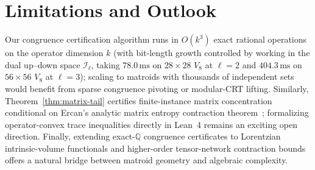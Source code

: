 \documentclass[11pt,a4paper]{article}
\theoremstyle{definition}
\theoremstyle{remark}
\newcommand{\QQ}{\mathbb{Q}}
\begin{document}
\section{Limitations and Outlook}\label{sec:outlook}

Our congruence certification algorithm runs in $O(k^3)$ exact rational operations on the operator dimension $k$ (with bit-length growth controlled by working in the dual up--down space $\mathcal{I}_\ell$, taking $78.0\,\mathrm{ms}$ on $28\times 28$ $V_8$ at $\ell=2$ and $404.3\,\mathrm{ms}$ on $56\times 56$ $V_8$ at $\ell=3$); scaling to matroids with thousands of independent sets would benefit from sparse congruence pivoting or modular-CRT lifting. Similarly, Theorem~\ref{thm:matrix-tail} certifies finite-instance matrix concentration conditional on Ercan's analytic matrix entropy contraction theorem~\cite{ercan2026lorentzian}; formalizing operator-convex trace inequalities directly in Lean~4 remains an exciting open direction. Finally, extending exact-$\QQ$ congruence certificates to Lorentzian intrinsic-volume functionals and higher-order tensor-network contraction bounds offers a natural bridge between matroid geometry and algebraic complexity.



\end{document}
